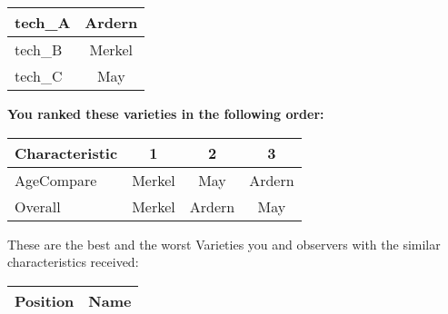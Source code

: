 \documentclass[10pt]{article}
\begin{document}
\begin{titlepage}
\begin{flushleft}
\begin{tabularx}{\textwidth}{ X | c  }
			
				tech\_A & Ardern \\ \hline
			
				tech\_B & Merkel \\ \hline
			
				tech\_C & May \\ \hline
			


		\end{tabularx}\newline \newline

		\textbf{You ranked these varieties in the following order: }\hfill \break
		\begin{tabularx}{\textwidth}{ X | c | c | c  }
			\hline
			\textbf{Characteristic}
			
				& \textbf{ 1 }
			
				& \textbf{ 2 }
			
				& \textbf{ 3 }
			
			\\ \hline


			
				AgeCompare & Merkel  & May  & Ardern  \\ \hline


			
				Overall & Merkel  & Ardern  & May  \\ \hline


			

		\end{tabularx}

	\end{flushleft}

	\pagebreak

	\begin{flushleft}
		These are the best and the worst Varieties you and observers with the similar characteristics received:\hfill \break \newline
		\begin{tabularx}{\textwidth}{ X | X  }
			\hline
			\textbf{Position} & \textbf{Name} \\ \hline

			


\end{tabularx}
\end{flushleft}
\end{titlepage}
\end{document}
